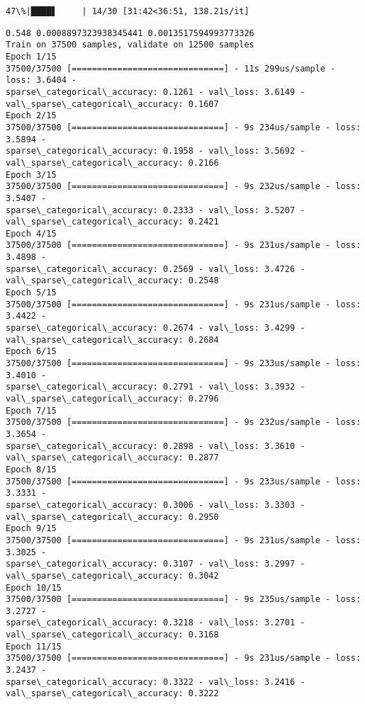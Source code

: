 \documentclass[11pt]{article}
\begin{document}
    \begin{Verbatim}[commandchars=\\\{\}]
 47\%|████▋     | 14/30 [31:42<36:51, 138.21s/it]
    \end{Verbatim}

    \begin{Verbatim}[commandchars=\\\{\}]
0.548 0.0008897323938345441 0.0013517594993773326
Train on 37500 samples, validate on 12500 samples
Epoch 1/15
37500/37500 [==============================] - 11s 299us/sample - loss: 3.6404 -
sparse\_categorical\_accuracy: 0.1261 - val\_loss: 3.6149 -
val\_sparse\_categorical\_accuracy: 0.1607
Epoch 2/15
37500/37500 [==============================] - 9s 234us/sample - loss: 3.5894 -
sparse\_categorical\_accuracy: 0.1958 - val\_loss: 3.5692 -
val\_sparse\_categorical\_accuracy: 0.2166
Epoch 3/15
37500/37500 [==============================] - 9s 232us/sample - loss: 3.5407 -
sparse\_categorical\_accuracy: 0.2333 - val\_loss: 3.5207 -
val\_sparse\_categorical\_accuracy: 0.2421
Epoch 4/15
37500/37500 [==============================] - 9s 231us/sample - loss: 3.4898 -
sparse\_categorical\_accuracy: 0.2569 - val\_loss: 3.4726 -
val\_sparse\_categorical\_accuracy: 0.2548
Epoch 5/15
37500/37500 [==============================] - 9s 231us/sample - loss: 3.4422 -
sparse\_categorical\_accuracy: 0.2674 - val\_loss: 3.4299 -
val\_sparse\_categorical\_accuracy: 0.2684
Epoch 6/15
37500/37500 [==============================] - 9s 233us/sample - loss: 3.4010 -
sparse\_categorical\_accuracy: 0.2791 - val\_loss: 3.3932 -
val\_sparse\_categorical\_accuracy: 0.2796
Epoch 7/15
37500/37500 [==============================] - 9s 232us/sample - loss: 3.3654 -
sparse\_categorical\_accuracy: 0.2898 - val\_loss: 3.3610 -
val\_sparse\_categorical\_accuracy: 0.2877
Epoch 8/15
37500/37500 [==============================] - 9s 233us/sample - loss: 3.3331 -
sparse\_categorical\_accuracy: 0.3006 - val\_loss: 3.3303 -
val\_sparse\_categorical\_accuracy: 0.2950
Epoch 9/15
37500/37500 [==============================] - 9s 231us/sample - loss: 3.3025 -
sparse\_categorical\_accuracy: 0.3107 - val\_loss: 3.2997 -
val\_sparse\_categorical\_accuracy: 0.3042
Epoch 10/15
37500/37500 [==============================] - 9s 235us/sample - loss: 3.2727 -
sparse\_categorical\_accuracy: 0.3218 - val\_loss: 3.2701 -
val\_sparse\_categorical\_accuracy: 0.3168
Epoch 11/15
37500/37500 [==============================] - 9s 231us/sample - loss: 3.2437 -
sparse\_categorical\_accuracy: 0.3322 - val\_loss: 3.2416 -
val\_sparse\_categorical\_accuracy: 0.3222

\end{Verbatim}
\end{document}
